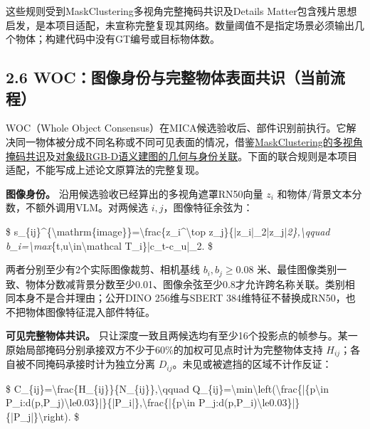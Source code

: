 \documentclass[UTF8,fontset=fandol]{ctexart}
\begin{document}
这些规则受到MaskClustering多视角完整掩码共识及Details Matter包含残片思想启发，是本项目适配，未宣称完整复现其网络。数量阈值不是指定场景必须输出几个物体；构建代码中没有GT编号或目标物体数。



\subsection*{2.6 WOC：图像身份与完整物体表面共识（当前流程）}

WOC（Whole Object Consensus）在MICA候选验收后、部件识别前执行。它解决同一物体被分成不同名称或不同可见表面的情况，借鉴\href{https://github.com/PKU-EPIC/MaskClustering}{MaskClustering的多视角掩码共识}及\href{https://arxiv.org/abs/1903.00268}{对象级RGB-D语义建图的几何与身份关联}。下面的联合规则是本项目适配，不能写成上述论文原算法的完整复现。



\textbf{图像身份。} 沿用候选验收已经算出的多视角遮罩RN50向量 $z_i$ 和物体/背景文本分数，不额外调用VLM。对两候选 $i,j$，图像特征余弦为：



\$
s\_\{ij\}\textasciicircum{}\{\textbackslash{}mathrm\{image\}\}=\textbackslash{}frac\{z\_i\textasciicircum{}\textbackslash{}top z\_j\}\{|z\_i|\_2|z\_j|\emph{2\},\textbackslash{}qquad
b\_i=\textbackslash{}max}\{t,u\textbackslash{}in\textbackslash{}mathcal T\_i\}|c\_t-c\_u|\_2.
\$



两者分别至少有2个实际图像裁剪、相机基线 $b_i,b_j\ge0.08$ 米、最佳图像类别一致、物体分数减背景分数至少0.01、图像余弦至少0.8才允许跨名称关联。类别相同本身不是合并理由；公开DINO 256维与SBERT 384维特征不替换成RN50，也不把物体图像特征混入部件特征。



\textbf{可见完整物体共识。} 只让深度一致且两候选均有至少16个投影点的帧参与。某一原始局部掩码分别承接双方不少于60\%的加权可见点时计为完整物体支持 $H_{ij}$；各自被不同掩码承接时计为独立分离 $D_{ij}$。未见或被遮挡的区域不计作反证：



\$
C\_\{ij\}=\textbackslash{}frac\{H\_\{ij\}\}\{N\_\{ij\}\},\textbackslash{}qquad
Q\_\{ij\}=\textbackslash{}min\textbackslash{}left(\textbackslash{}frac\{|\{p\textbackslash{}in P\_i:d(p,P\_j)\textbackslash{}le0.03\}|\}\{|P\_i|\},\textbackslash{}frac\{|\{p\textbackslash{}in P\_j:d(p,P\_i)\textbackslash{}le0.03\}|\}\{|P\_j|\}\textbackslash{}right).
\$
\end{document}
